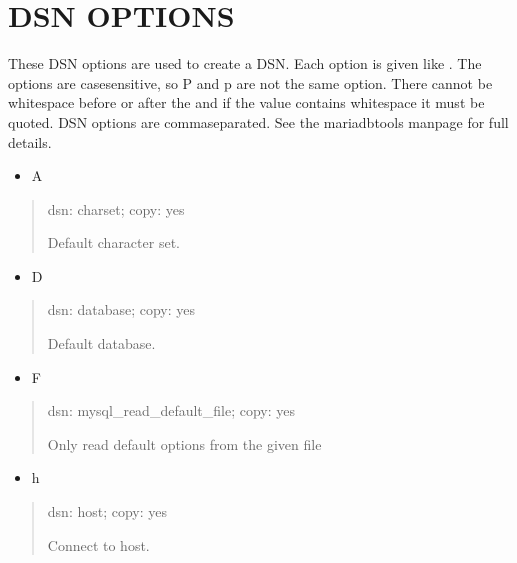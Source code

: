 \documentclass[letterpaper,10pt,english]{sphinxmanual}
\begin{document}
\section{DSN OPTIONS}
\label{\detokenize{mariadb-config-diff:dsn-options}}
\sphinxAtStartPar
These DSN options are used to create a DSN.  Each option is given like
.  The options are case\sphinxhyphen{}sensitive, so P and p are not the
same option.  There cannot be whitespace before or after the \sphinxcode{\sphinxupquote{=}} and
if the value contains whitespace it must be quoted.  DSN options are
comma\sphinxhyphen{}separated.  See the mariadb\sphinxhyphen{}tools manpage for full details.
\begin{itemize}
\item {} 
\sphinxAtStartPar
A

\end{itemize}
\begin{quote}

\sphinxAtStartPar
dsn: charset; copy: yes

\sphinxAtStartPar
Default character set.
\end{quote}
\begin{itemize}
\item {} 
\sphinxAtStartPar
D

\end{itemize}
\begin{quote}

\sphinxAtStartPar
dsn: database; copy: yes

\sphinxAtStartPar
Default database.
\end{quote}
\begin{itemize}
\item {} 
\sphinxAtStartPar
F

\end{itemize}
\begin{quote}

\sphinxAtStartPar
dsn: mysql\_read\_default\_file; copy: yes

\sphinxAtStartPar
Only read default options from the given file
\end{quote}
\begin{itemize}
\item {} 
\sphinxAtStartPar
h

\end{itemize}
\begin{quote}

\sphinxAtStartPar
dsn: host; copy: yes

\sphinxAtStartPar
Connect to host.
\end{quote}
\end{document}
